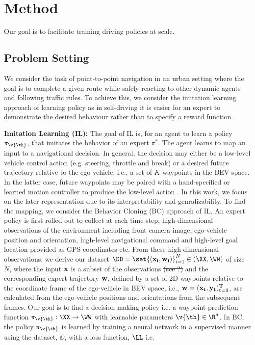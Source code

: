 \documentclass[letterpaper, 12pt]{article}
\theoremstyle{definition}
\theoremstyle{definition}
\theoremstyle{definition}
\theoremstyle{definition}
\theoremstyle{definition}
\begin{document}
\section{Method \label{orgcb46f01}}
\label{sec:org84f9401}
Our goal is to facilitate training driving policies at scale.


\subsection{Problem Setting \label{org2b0df1b}}
\label{sec:org474d5b3}
We consider the task of point-to-point navigation in an urban setting where
the goal is to complete a given route while safely reacting to other dynamic
agents and following traffic rules. To achieve this, we consider the imitation
learning approach of learning policy as in self-driving it is easier for an
expert to demonstrate the desired behaviour rather than to specify a reward
function.

\textbf{Imitation Learning (IL):} The goal of IL is, for an agent to learn a policy
 \(\pi_{\v{\th}}\), that imitates the behavior of an expert \(\pi^{*}\). The agent
 learns to map an input to a navigational decision. In general, the decision
 may either be a low-level vehicle control action \cite{Codevilla2019}
 (e.g. steering, throttle and break) or a desired future trajectory relative
 to the ego-vehicle, i.e., a set of \(K\) waypoints
 \cite{Chen2019,Mueller2018} in the BEV space. In the latter case, future
 waypoints may be paired with a hand-specified or learned motion controller to
 produce the low-level action \cite{Chen2019,Mueller2018}. In this work, we
 focus on the later representation due to its interpretability and
 genralizability. To find the mapping, we consider the Behavior Cloning (BC)
 approach of IL. An expert policy is first rolled out to collect at each
 time-step, high-dimensional observations of the environment including front
 camera image, ego-vehicle position and orientation, high-level navigational
 command and high-level goal location provided as GPS coordinates etc. From
 these high-dimensional observations, we derive our dataset \(\DD = \set{(\bf
   x_{i}, \bf w_{i})}_{i=1}^{N}\in(\XX,\WW)\) of size \(N\), where the input
 \(\bf x\) is a subset of the observations \sout{(see ?)} and the corresponding
 expert trajectory \(\bf w\), defined by a set of 2D waypoints relative to the
 coordinate frame of the ego-vehicle in BEV space, i.e., \(\bf
   w=(x_{t},y_{t})_{t=1}^{T}\), are calculated from the ego-vehicle positions
 and orientations from the subsequent frames. Our goal is to find a decision
 making policy i.e. a waypoint prediction function \(\pi_{\v{\th}}:\XX\to\WW\)
 with learnable parameters \(\v{\th}\in\R^{d}\). In BC, the policy
 \(\pi_{\v{\th}}\) is learned by training a neural network in a supervised
 manner using the dataset, \(\DD\), with a loss function, \(\LL\) i.e.
\end{document}
